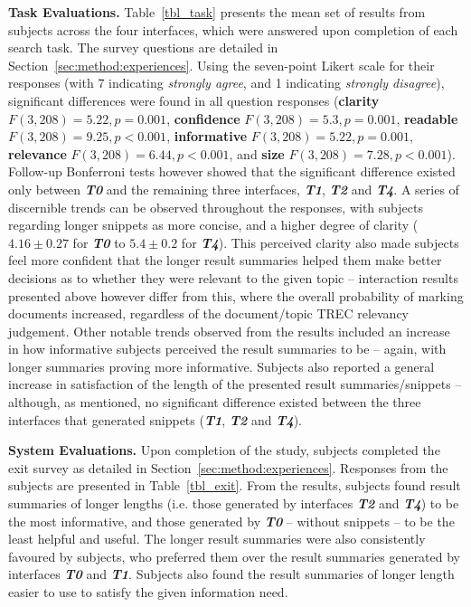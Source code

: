 \noindent\textbf{Task Evaluations.}
Table~\ref{tbl_task} presents the mean set of results from subjects across the four interfaces, which were answered upon completion of each search task. The survey questions are detailed in Section~\ref{sec:method:experiences}. Using the seven-point Likert scale for their responses (with 7 indicating \emph{strongly agree}, and 1 indicating \emph{strongly disagree}), significant differences were found in all question responses (\textbf{clarity} $F(3,208)=5.22, p=0.001$, \textbf{confidence} $F(3,208)=5.3, p=0.001$, \textbf{readable} $F(3,208)=9.25, p<0.001$, \textbf{informative} $F(3,208)=5.22, p=0.001$, \textbf{relevance} $F(3,208)=6.44, p<0.001$, and \textbf{size} $F(3,208)=7.28, p<0.001$). Follow-up Bonferroni tests however showed that the significant difference existed only between \textbf{\emph{T0}} and the remaining three interfaces, \textbf{\emph{T1}}, \textbf{\emph{T2}} and \textbf{\emph{T4}}. A series of discernible trends can be observed throughout the responses, with subjects regarding longer snippets as more concise, and a higher degree of clarity ($4.16\pm0.27$ for \textbf{\emph{T0}} to $5.4\pm0.2$ for \textbf{\emph{T4}}). This perceived clarity also made subjects feel more confident that the longer result summaries helped them make better decisions as to whether they were relevant to the given topic -- interaction results presented above however differ from this, where the overall probability of marking documents increased, regardless of the document/topic TREC relevancy judgement. Other notable trends observed from the results included an increase in how informative subjects perceived the result summaries to be -- again, with longer summaries proving more informative. Subjects also reported a general increase in satisfaction of the length of the presented result summaries/snippets -- although, as mentioned, no significant difference existed between the three interfaces that generated snippets (\textbf{\emph{T1}}, \textbf{\emph{T2}} and \textbf{\emph{T4}}). 

\vspace{2mm}
\noindent\textbf{System Evaluations.}
Upon completion of the study, subjects completed the exit survey as detailed in Section~\ref{sec:method:experiences}. Responses from the subjects are presented in Table~\ref{tbl_exit}. From the results, subjects found result summaries of longer lengths (i.e. those generated by interfaces \textbf{\emph{T2}} and \textbf{\emph{T4}}) to be the most informative, and those generated by \textbf{\emph{T0}} -- without snippets -- to be the least helpful and useful. The longer result summaries were also consistently favoured by subjects, who preferred them over the result summaries generated by interfaces \textbf{\emph{T0}} and \textbf{\emph{T1}}. Subjects also found the result summaries of longer length easier to use to satisfy the given information need.

